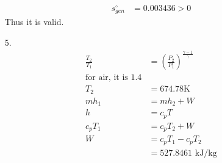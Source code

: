 \documentclass{article}
\begin{document}
\begin{itemize}
\begin{align*}
        s^{\circ}_{gen}&=0.003436>0
    \end{align*}
    Thus it is valid.
    \item [5.]
        \begin{align*}
            \frac{T_2}{T_1}&=\left(\frac{P_2}{P_1}\right)^{\frac{\gamma-1}{\gamma}}\\
            \text{for air, it is 1.4}\\
            T_2&=674.78 \text{K}\\
            mh_1&=mh_2+W\\
            h&=c_pT\\
            c_pT_1&=c_pT_2+W\\
            W&=c_pT_1-c_pT_2\\
            &=527.8461 \text{ kJ/kg}
        \end{align*}
\end{itemize}     
\end{document}
